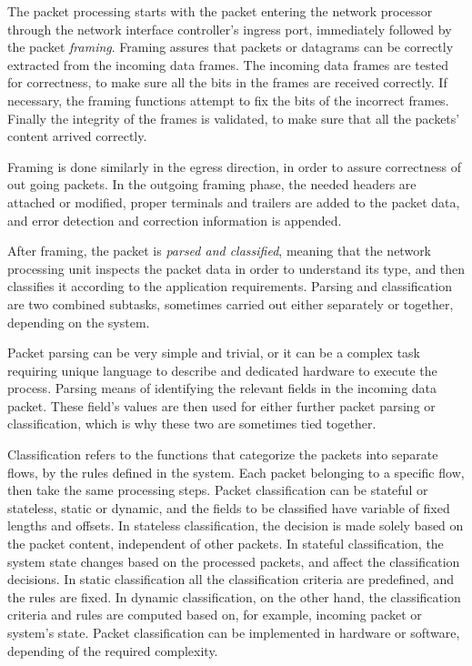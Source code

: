 The packet processing starts with the packet entering the network processor through the network interface controller's ingress port, immediately followed by the packet \emph{framing}. Framing assures that packets or datagrams can be correctly extracted from the incoming data frames. The incoming data frames are tested for correctness, to make sure all the bits in the frames are received correctly. If necessary, the framing functions attempt to fix the bits of the incorrect frames. Finally the integrity of the frames is validated, to make sure that all the packets' content arrived correctly.~\cite{Giladi:2008:Network}

Framing is done similarly in the egress direction, in order to assure correctness of out going packets. In the outgoing framing phase, the needed headers are attached or modified, proper terminals and trailers are added to the packet data, and error detection and correction information is appended.~\cite{Giladi:2008:Network}

After framing, the packet is \emph{parsed and classified}, meaning that the network processing unit inspects the packet data in order to understand its type, and then classifies it according to the application requirements. Parsing and classification are two combined subtasks, sometimes carried out either separately or together, depending on the system.~\cite{Giladi:2008:Network}

Packet parsing can be very simple and trivial, or it can be a complex task requiring unique language to describe and dedicated hardware to execute the process. Parsing means of identifying the relevant fields in the incoming data packet. These field's values are then used for either further packet parsing or classification, which is why these two are sometimes tied together.~\cite{Giladi:2008:Network}

Classification refers to the functions that categorize the packets into separate flows, by the rules defined in the system. Each packet belonging to a specific flow, then take the same processing steps. Packet classification can be stateful or stateless, static or dynamic, and the fields to be classified have variable of fixed lengths and offsets. In stateless classification, the decision is made solely based on the packet content, independent of other packets. In stateful classification, the system state changes based on the processed packets, and affect the classification decisions. In static classification all the classification criteria are predefined, and the rules are fixed. In dynamic classification, on the other hand, the classification criteria and rules are computed based on, for example, incoming packet or system's state. Packet classification can be implemented in hardware or software, depending of the required complexity.~\cite{Giladi:2008:Network}

